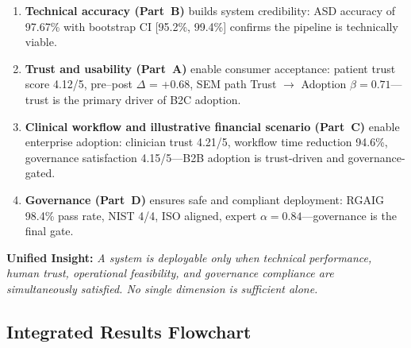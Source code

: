 \begin{enumerate}[label=\textbf{\arabic*.}, leftmargin=2cm]
    \item \textbf{Technical accuracy (Part~B)} builds system credibility: ASD accuracy of 97.67\% with bootstrap CI [95.2\%, 99.4\%] confirms the pipeline is technically viable.
    \item \textbf{Trust and usability (Part~A)} enable consumer acceptance: patient trust score 4.12/5, pre--post $\Delta$ = +0.68, SEM path Trust $\to$ Adoption $\beta = 0.71$---trust is the primary driver of B2C adoption.
    \item \textbf{Clinical workflow and illustrative financial scenario (Part~C)} enable enterprise adoption: clinician trust 4.21/5, workflow time reduction 94.6\%, governance satisfaction 4.15/5---B2B adoption is trust-driven and governance-gated.
    \item \textbf{Governance (Part~D)} ensures safe and compliant deployment: RGAIG 98.4\% pass rate, NIST 4/4, ISO aligned, expert $\alpha = 0.84$---governance is the final gate.
\end{enumerate}

\noindent\textbf{Unified Insight:} \textit{A system is deployable only when technical performance, human trust, operational feasibility, and governance compliance are simultaneously satisfied. No single dimension is sufficient alone.}

\subsection{Integrated Results Flowchart}

